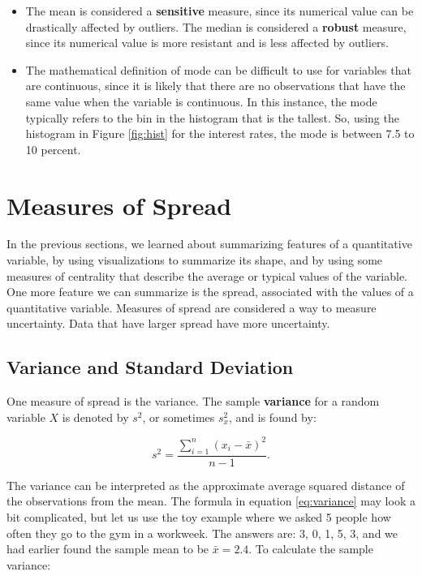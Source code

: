 \documentclass[
]{book}
\begin{document}
\begin{itemize}
\item
  The mean is considered a \textbf{sensitive} measure, since its numerical value can be drastically affected by outliers. The median is considered a \textbf{robust} measure, since its numerical value is more resistant and is less affected by outliers.
\item
  The mathematical definition of mode can be difficult to use for variables that are continuous, since it is likely that there are no observations that have the same value when the variable is continuous. In this instance, the mode typically refers to the bin in the histogram that is the tallest. So, using the histogram in Figure \ref{fig:hist} for the interest rates, the mode is between 7.5 to 10 percent.
\end{itemize}

\hypertarget{measures-of-spread}{%
\section{Measures of Spread}\label{measures-of-spread}}

In the previous sections, we learned about summarizing features of a quantitative variable, by using visualizations to summarize its shape, and by using some measures of centrality that describe the average or typical values of the variable. One more feature we can summarize is the spread, associated with the values of a quantitative variable. Measures of spread are considered a way to measure uncertainty. Data that have larger spread have more uncertainty.

\hypertarget{variance-and-standard-deviation}{%
\subsection{Variance and Standard Deviation}\label{variance-and-standard-deviation}}

One measure of spread is the variance. The sample \textbf{variance} for a random variable \(X\) is denoted by \(s^2\), or sometimes \(s_x^2\), and is found by:

\begin{equation} 
s^2 = \frac{\sum_{i=1}^n (x_i-\bar{x})^2}{n-1}.
\label{eq:variance}
\end{equation}

The variance can be interpreted as the approximate average squared distance of the observations from the mean. The formula in equation \eqref{eq:variance} may look a bit complicated, but let us use the toy example where we asked 5 people how often they go to the gym in a workweek. The answers are: 3, 0, 1, 5, 3, and we had earlier found the sample mean to be \(\bar{x} = 2.4\). To calculate the sample variance:
\end{document}
